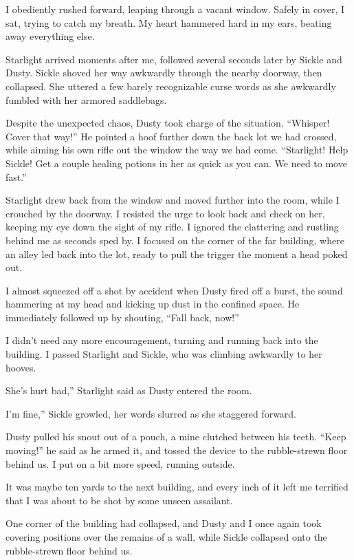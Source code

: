 I obediently rushed forward, leaping through a vacant window. Safely in cover, I sat, trying to catch my breath. My heart hammered hard in my ears, beating away everything else.

Starlight arrived moments after me, followed several seconds later by Sickle and Dusty. Sickle shoved her way awkwardly through the nearby doorway, then collapsed. She uttered a few barely recognizable curse words as she awkwardly fumbled with her armored saddlebags.

Despite the unexpected chaos, Dusty took charge of the situation. “Whisper! Cover that way!” He pointed a hoof further down the back lot we had crossed, while aiming his own rifle out the window the way we had come. “Starlight! Help Sickle! Get a couple healing potions in her as quick as you can. We need to move fast.”

Starlight drew back from the window and moved further into the room, while I crouched by the doorway. I resisted the urge to look back and check on her, keeping my eye down the sight of my rifle. I ignored the clattering and rustling behind me as seconds sped by. I focused on the corner of the far building, where an alley led back into the lot, ready to pull the trigger the moment a head poked out.

I almost squeezed off a shot by accident when Dusty fired off a burst, the sound hammering at my head and kicking up dust in the confined space. He immediately followed up by shouting, “Fall back, now!”

I didn’t need any more encouragement, turning and running back into the building. I passed Starlight and Sickle, who was climbing awkwardly to her hooves.

\leavevmode{}She’s hurt bad,” Starlight said as Dusty entered the room.

\leavevmode{}I’m fine,” Sickle growled, her words slurred as she staggered forward.

Dusty pulled his snout out of a pouch, a mine clutched between his teeth. “Keep moving!” he said as he armed it, and tossed the device to the rubble-strewn floor behind us. I put on a bit more speed, running outside.

It was maybe ten yards to the next building, and every inch of it left me terrified that I was about to be shot by some unseen assailant.

One corner of the building had collapsed, and Dusty and I once again took covering positions over the remains of a wall, while Sickle collapsed onto the rubble-strewn floor behind us.

